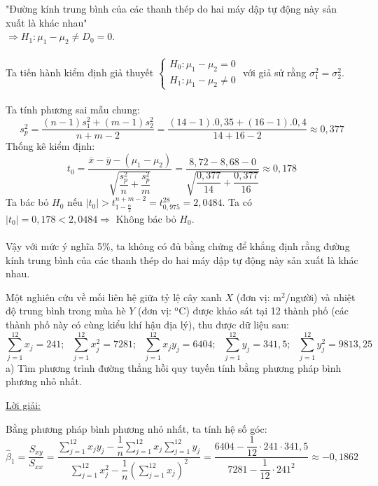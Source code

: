 \documentclass[10pt, a4paper]{article}
\begin{document}
"Đường kính trung bình của các thanh thép do hai máy dập tự động này sản xuất là khác nhau"\\$\Rightarrow H_1:\mu_1-\mu_2\ne D_0=0$.\\\\
Ta tiến hành kiểm định giả thuyết $\begin{cases}
	H_0:\mu_1-\mu_2=0\\
	H_1:\mu_1-\mu_2\ne0
\end{cases}$ với giả sử rằng $\sigma_1^2=\sigma_2^2$.\\\\
Ta tính phương sai mẫu chung: $$s_p^2=\frac{(n-1)s_1^2+(m-1)s_2^2}{n+m-2}=\frac{(14-1).0,35+(16-1).0,4}{14+16-2}\approx0,377$$
Thống kê kiểm định: $$t_0=\frac{\overline x-\overline y-(\mu_1-\mu_2)}{\sqrt{\dfrac{s_p^2}{n}+\dfrac{s_p^2}{m}}}=\frac{8,72-8,68-0}{\sqrt{\dfrac{0,377}{14}+\dfrac{0,377}{16}}}\approx0,178$$
Ta bác bỏ $H_0$ nếu $|t_0|>t_{1-\frac\alpha2}^{n+m-2}=t^{28}_{0,975}=2,0484$. Ta có $|t_0|=0,178<2,0484\Rightarrow$ Không bác bỏ $H_0$.\\\\
Vậy với mức ý nghĩa 5\%, ta không có đủ bằng chứng để khẳng định rằng đường kính trung bình của các thanh thép do hai máy dập tự động này sản xuất là khác nhau.
\vspace{3mm}
\begin{tcolorbox}[enhanced,colback=blue!5!white,colframe=blue!75!black,sharp corners=all,shadow={0mm}{0mm}{-1.5mm}%
{fill=blue!75!red,opacity=0.3},title=\textbf{Bài 3}]
Một nghiên cứu về mối liên hệ giữa tỷ lệ cây xanh $X$ (đơn vị: m$^2$/người) và nhiệt độ trung bình trong mùa hè $Y$ (đơn vị: $^\text{o}$C) được khảo sát tại 12 thành phố (các thành phố này có cùng kiểu khí hậu địa lý), thu được dữ liệu sau: $$\displaystyle\sum_{j=1}^{12}x_j=241;~~~\displaystyle\sum_{j=1}^{12}x_j^2=7281;~~~\displaystyle\sum_{j=1}^{12}x_jy_j=6404;~~~\displaystyle\sum_{j=1}^{12}y_j=341,5;~~~\displaystyle\sum_{j=1}^{12}y_j^2=9813,25$$
\color{red}a) \color{black}Tìm phương trình đường thẳng hồi quy tuyến tính bằng phương pháp bình phương nhỏ nhất.
\end{tcolorbox}
\begin{center}
	\color{blue}\underline{Lời giải:}
\end{center}
Bằng phương pháp bình phương nhỏ nhất, ta tính hệ số góc: $$\hat\beta_1=\frac{S_{xy}}{S_{xx}}=\frac{\displaystyle\sum_{j=1}^{12}x_jy_j-\dfrac1n\displaystyle\sum_{j=1}^{12}x_j\displaystyle\sum_{j=1}^{12}y_j}{\displaystyle\sum_{j=1}^{12}x_j^2-\dfrac1n\left(\displaystyle\sum_{j=1}^{12}x_j\right)^2}=\frac{6404-\dfrac{1}{12}\cdot241\cdot341,5}{7281-\dfrac{1}{12}\cdot241^2}\approx-0,1862$$
\end{document}
